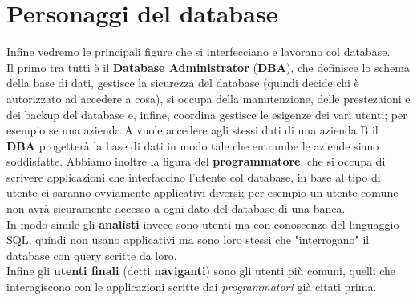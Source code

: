\section{Personaggi del database}
Infine vedremo le principali figure che si interfecciano 
e lavorano col database. \\
Il primo tra tutti è il \textbf{Database Administrator} (\textbf{DBA}),
che definisce lo schema della base di dati, gestisce la sicurezza del database
(quindi decide chi è autorizzato ad accedere a cosa), si occupa della 
manutenzione, delle prestezaioni e dei backup del database e, infine, 
coordina gestisce le esigenze dei vari utenti; per esempio se una azienda A 
vuole accedere agli stessi dati di una azienda B il \textbf{DBA} progetterà
la base di dati in modo tale che entrambe le aziende siano soddisfatte.
Abbiamo inoltre la figura del \textbf{programmatore}, che si occupa
di scrivere applicazioni che interfaccino l'utente col database, in base 
al tipo di utente ci saranno ovviamente applicativi diversi;
per esempio un utente comune non avrà sicuramente accesso a \underline{ogni}
dato del database di una banca. \\
In modo simile gli \textbf{analisti} invece sono utenti ma con conoscenze del
linguaggio SQL, quindi non usano applicativi ma sono loro stessi che "interrogano"
il database con query scritte da loro. \\
Infine gli \textbf{utenti finali} (detti \textbf{naviganti}) sono gli utenti
più comuni, quelli che interagiscono con le applicazioni scritte dai 
\textit{programmatori} già citati prima.